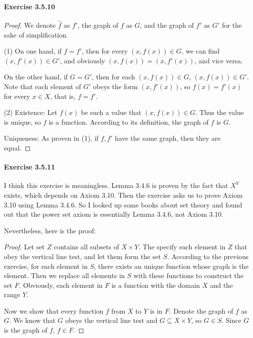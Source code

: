 \paragraph{Exercise 3.5.10} \label{exercise3.5.10}
\begin{proof}
We denote $\overset{\sim}{f}$ as $f'$, the graph of $f$ as $G$, and the graph of $f'$ as $G'$ for the 
sake of simplification.

(1) On one hand, if $f = f'$, then for every $(x,f(x)) \in G$, we can find $(x,f'(x)) \in G'$, and 
obviously $(x,f(x)) = (x,f'(x))$, and vice versa.

On the other hand, if $G = G'$, then for each $(x,f(x)) \in G$, $(x,f(x)) \in G'$. Note that each 
element of $G'$ obeys the form $(x,f'(x))$, so $f(x) = f'(x)$ for every $x \in X$, that is, $f=f'$.

(2) Existence: Let $f(x)$ be such a value that $(x,f(x)) \in G$. Thus the value is unique, so $f$ is a 
function. According to its definition, the graph of $f$ is $G$.

Uniqueness: As proven in (1), if $f,f'$ have the same graph, then they are equal.
\end{proof}

\paragraph{Exercise 3.5.11} \label{exercise3.5.11}
I think this exercise is meaningless. Lemma 3.4.6 is proven by the fact that $X^Y$ exists, which depends 
on Axiom 3.10. Then the exercise asks us to prove Axiom 3.10 using Lemma 3.4.6. So I looked up some books 
about set theory and found out that the power set axiom is essentially Lemma 3.4.6, not Axiom 3.10.

Nevertheless, here is the proof:
\begin{proof}
Let set $Z$ contains all subsets of $X\times Y$. The specify such element in $Z$ that obey the vertical 
line test, and let them form the set $S$. According to the previous exercise, for each element in $S$, 
there exists an unique function whose graph is the element. Then we replace all elements in $S$ with 
these functions to construct the set $F$. Obviously, each element in $F$ is a function with the domain 
$X$ and the range $Y$.

Now we show that every function $f$ from $X$ to $Y$ is in $F$. Denote the graph of $f$ as $G$. We know 
that $G$ obeys the vertical line test and $G \subseteq X \times Y$, so $G \in S$. Since $G$ is the graph 
of $f$, $f \in F$.
\end{proof}

